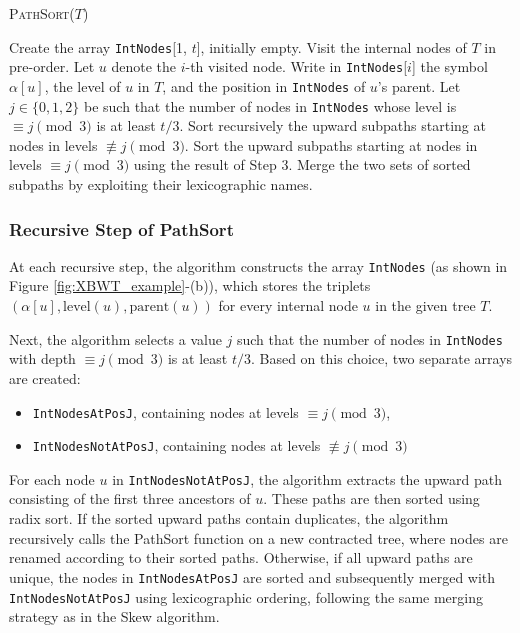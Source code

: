 \begin{algorithm}
    \caption{\textsc{PathSort}($T$)}
    \label{alg:pathSort}
    \begin{algorithmic}[1]
    \State Create the array \texttt{IntNodes}[1, $t$], initially empty.
    \State Visit the internal nodes of $T$ in pre-order. Let $u$ denote the $i$-th visited node.
    \State Write in \texttt{IntNodes}[$i$] the symbol $\alpha[u]$, the level of $u$ in $T$, and the position in \texttt{IntNodes} of $u$'s parent.
    \State Let $j \in \{0, 1, 2\}$ be such that the number of nodes in \texttt{IntNodes} whose level is $\equiv j \pmod{3}$ is at least $t/3$. Sort recursively the upward subpaths starting at nodes in levels $\not\equiv j \pmod{3}$.
    \State Sort the upward subpaths starting at nodes in levels $\equiv j \pmod{3}$ using the result of Step 3.
    \State Merge the two sets of sorted subpaths by exploiting their lexicographic names.
    \end{algorithmic}
\end{algorithm}

\subsubsection{Recursive Step of PathSort}
At each recursive step, the algorithm constructs the array \texttt{IntNodes} (as shown in Figure \ref{fig:XBWT_example}-(b)), which stores the triplets $(\alpha[u], \text{level}(u), \text{parent}(u))$ for every internal node $u$ in the given tree $T$.  

Next, the algorithm selects a value $j$ such that the number of nodes in \texttt{IntNodes} with depth $\equiv j \pmod{3}$ is at least $t/3$. Based on this choice, two separate arrays are created:  
\begin{itemize}
    \item \texttt{IntNodesAtPosJ}, containing nodes at levels $\equiv j \pmod{3}$,
    \item \texttt{IntNodesNotAtPosJ}, containing nodes at levels $\not\equiv j \pmod{3}$
\end{itemize}

For each node $u$ in \texttt{IntNodesNotAtPosJ}, the algorithm extracts the upward path consisting of the first three ancestors of $u$. These paths are then sorted using radix sort. If the sorted upward paths contain duplicates, the algorithm recursively calls the PathSort function on a new contracted tree, where nodes are renamed according to their sorted paths. Otherwise, if all upward paths are unique, the nodes in \texttt{IntNodesAtPosJ} are sorted and subsequently merged with \texttt{IntNodesNotAtPosJ} using lexicographic ordering, following the same merging strategy as in the Skew algorithm.

